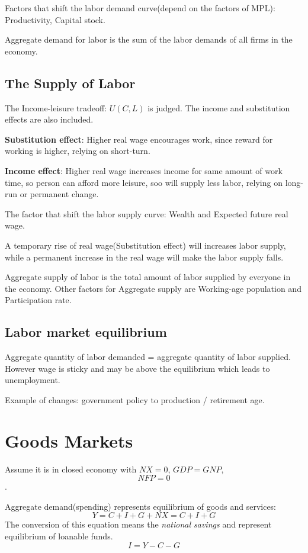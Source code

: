 \documentclass[10pt, a4paper]{article}
\begin{document}
            Factors that shift the labor demand curve(depend on the factors of MPL): Productivity, Capital stock.
            
            Aggregate demand for labor is the sum of the labor demands of all firms in the economy. 
            
        \subsection{The Supply of Labor}
            The Income-leisure tradeoff: $U(C, L)$ is judged. The income and substitution effects are also included. 

            \textbf{Substitution effect}: Higher real wage encourages work, since reward for working is higher, relying on short-turn.

            \textbf{Income effect}: Higher real wage increases income for same amount of work time, so person can afford more leisure, soo will supply less labor, relying on long-run or permanent change. 
            
            The factor that shift the labor supply curve: Wealth and Expected future real wage. 

            A temporary rise of real wage(Substitution effect) will increases labor supply, while a permanent increase in the real wage will make the labor supply falls. 

            Aggregate supply of labor is the total amount of labor supplied by everyone in the economy.
            Other factors for Aggregate supply are Working-age population and Participation rate. 
        \subsection{Labor market equilibrium}
            Aggregate quantity of labor demanded = aggregate quantity of labor supplied. However wage is sticky and may be above the equilibrium which leads to unemployment. 

            Example of changes: government policy to production / retirement age. 
    \section{Goods Markets}
        Assume it is in closed economy with $NX = 0$, $GDP = GNP$, $$NFP = 0$$.
        
        Aggregate demand(spending) represents equilibrium of goods and services: 
        $$Y = C + I + G + NX = C + I + G$$
        The conversion of this equation means the \emph{national savings} and represent equilibrium of loanable funds. 
        $$I = Y - C - G$$ 
\end{document}
